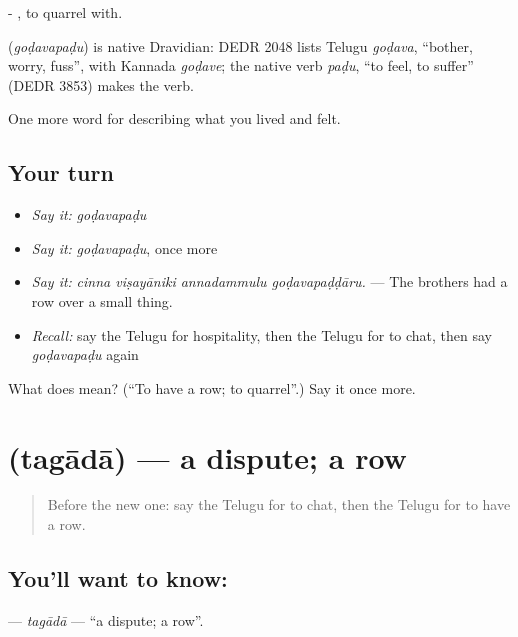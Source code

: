 - , to quarrel with.

\begin{cousinweb}
\textbf{} (\emph{goḍavapaḍu}) is native Dravidian: DEDR 2048 lists Telugu \emph{goḍava}, \textquotedblleft{}bother, worry, fuss\textquotedblright{}, with Kannada \emph{goḍave}; the native verb \emph{paḍu}, \textquotedblleft{}to feel, to suffer\textquotedblright{} (DEDR 3853) makes the verb.
\end{cousinweb}

\begin{grammarlens}[title={What you've built}]
One more word for describing what you lived and felt.
\end{grammarlens}

\subsection*{Your turn}
\begin{itemize}
\raggedright
  \item \emph{Say it:} \emph{goḍavapaḍu}
  \item \emph{Say it:} \emph{goḍavapaḍu}, once more
  \item \emph{Say it:} \emph{cinna viṣayāniki annadammulu goḍavapaḍḍāru.} — The brothers had a row over a small thing.
  \item \emph{Recall:} say the Telugu for hospitality, then the Telugu for to chat, then say \emph{goḍavapaḍu} again
\end{itemize}

\begin{tcolorbox}[breakable,colback=teal!4,colframe=teal!35!black,title={Before you move on}]
What does  mean? (\textquotedblleft{}To have a row; to quarrel\textquotedblright{}.) Say it once more.
\end{tcolorbox}
\section[\texorpdfstring{\te{తగాదా} (tagādā)}{తగాదా (tagādā)}]{ (tagādā) — a dispute; a row}

\label{lesson:TE-C534-tagada}



\begin{quote}
Before the new one: say the Telugu for to chat, then the Telugu for to have a row.
\end{quote}

\subsection*{You'll want to know: }
\textbf{} — \emph{tagādā} — \textquotedblleft{}a dispute; a row\textquotedblright{}.

